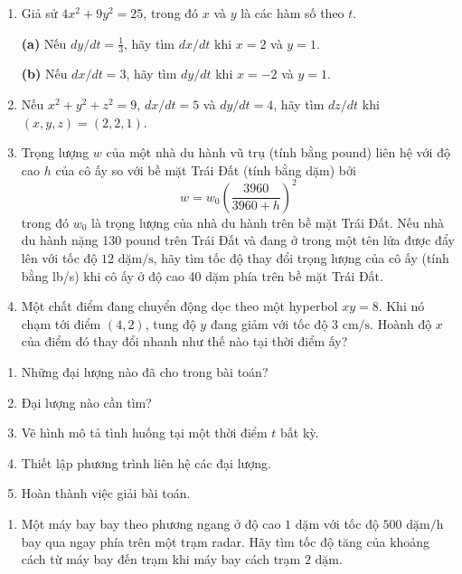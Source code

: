 \begin{minipage}[t]{0.482\textwidth}
\fontsize{9pt}{11.4pt}\selectfont
\begin{enumerate}[label=\textbf{\arabic*.}, leftmargin=1.35em, itemsep=0.48em, topsep=0pt, parsep=0pt, start=9]
\item Giả sử $4x^2 + 9y^2 = 25$, trong đó $x$ và $y$ là các hàm số theo $t$.
\par\smallskip
\textbf{(a)} Nếu $dy/dt = \frac{1}{3}$, hãy tìm $dx/dt$ khi $x = 2$ và $y = 1$.
\par\smallskip
\textbf{(b)} Nếu $dx/dt = 3$, hãy tìm $dy/dt$ khi $x = -2$ và $y = 1$.

\item Nếu $x^2 + y^2 + z^2 = 9$, $dx/dt = 5$ và $dy/dt = 4$, hãy tìm $dz/dt$ khi $(x, y, z) = (2, 2, 1)$.

\item Trọng lượng $w$ của một nhà du hành vũ trụ (tính bằng pound) liên hệ với độ cao $h$ của cô ấy so với bề mặt Trái Đất (tính bằng dặm) bởi
\[
w = w_0 \left(\frac{3960}{3960 + h}\right)^2
\]
trong đó $w_0$ là trọng lượng của nhà du hành trên bề mặt Trái Đất. Nếu nhà du hành nặng 130 pound trên Trái Đất và đang ở trong một tên lửa được đẩy lên với tốc độ $12\text{ dặm/s}$, hãy tìm tốc độ thay đổi trọng lượng của cô ấy (tính bằng lb/s) khi cô ấy ở độ cao 40 dặm phía trên bề mặt Trái Đất.

\item Một chất điểm đang chuyển động dọc theo một hyperbol $xy = 8$. Khi nó chạm tới điểm $(4, 2)$, tung độ $y$ đang giảm với tốc độ $3\text{ cm/s}$. Hoành độ $x$ của điểm đó thay đổi nhanh như thế nào tại thời điểm ấy?
\end{enumerate}

\vspace{0.45em}
\begin{enumerate}[label=\textbf{(\alph*)}, leftmargin=1.5em, itemsep=0.08em, topsep=0.2em, parsep=0pt]
\item Những đại lượng nào đã cho trong bài toán?
\item Đại lượng nào cần tìm?
\item Vẽ hình mô tả tình huống tại một thời điểm $t$ bất kỳ.
\item Thiết lập phương trình liên hệ các đại lượng.
\item Hoàn thành việc giải bài toán.
\end{enumerate}

\vspace{0.1em}
\begin{enumerate}[label=\textbf{\arabic*.}, leftmargin=1.35em, itemsep=0.48em, topsep=0.2em, parsep=0pt, start=13]
\item Một máy bay bay theo phương ngang ở độ cao $1\text{ dặm}$ với tốc độ $500\text{ dặm/h}$ bay qua ngay phía trên một trạm radar. Hãy tìm tốc độ tăng của khoảng cách từ máy bay đến trạm khi máy bay cách trạm $2\text{ dặm}$.


\end{enumerate}
\end{minipage}
